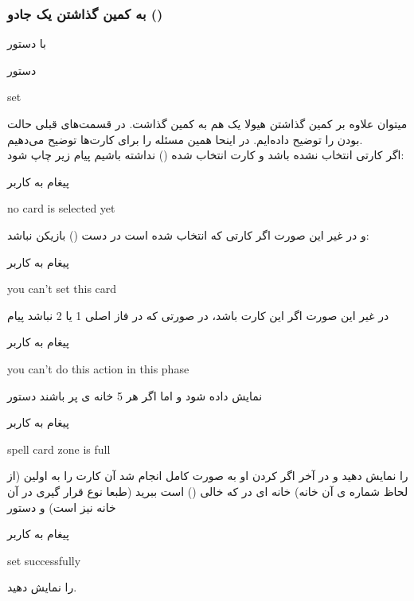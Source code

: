 \documentclass[]{article}
\begin{document}
\subsubsection*{{\titr به کمین گذاشتن یک جادو ()}}
با دستور 
\begin{mybox}[colback=yellow]{دستور}
	\begin{latin}	
	    set 	
	\end{latin}
\end{mybox}
میتوان علاوه بر کمین گذاشتن هیولا یک  هم به کمین گذاشت. در قسمت‌های 
قبلی حالت  بودن را توضیح داده‌ایم. در اینحا همین مسئله را برای 
 کارت‌ها توضیح می‌دهیم.
\\
اگر کارتی انتخاب نشده باشد و کارت انتخاب شده () نداشته باشیم 
پیام زیر چاپ شود:
\begin{mybox}[colback=yellow]{پیغام به کاربر}
	\begin{latin}	
		no card is selected yet
	\end{latin}
\end{mybox}
و در غیر این صورت اگر کارتی که انتخاب شده است در دست () بازیکن 
نباشد:
\begin{mybox}[colback=yellow]{پیغام به کاربر}
	\begin{latin}	
		you can’t set this card	
	\end{latin}
\end{mybox}
در غیر این صورت اگر این کارت  باشد، در صورتی که در فاز اصلی 1 یا 2 
نباشد پیام
\begin{mybox}[colback=yellow]{پیغام به کاربر}
	\begin{latin}	
		you can’t do this action in this phase
	\end{latin}
\end{mybox}
نمایش داده شود و اما اگر هر 5 خانه ی  پر باشند دستور
\begin{mybox}[colback=yellow]{پیغام به کاربر}
	\begin{latin}	
		spell card zone is full
	\end{latin}
\end{mybox}
را نمایش دهید و در آخر اگر  کردن او به صورت کامل انجام شد آن کارت را 
به اولین (از لحاظ شماره ی آن خانه) خانه ای در  که خالی 
() است ببرید (طبعا نوع قرار گیری در آن خانه نیز  است) و 
دستور
\begin{mybox}[colback=yellow]{پیغام به کاربر}
	\begin{latin}	
		set successfully
	\end{latin}
\end{mybox}
را نمایش دهید.
\end{document}
